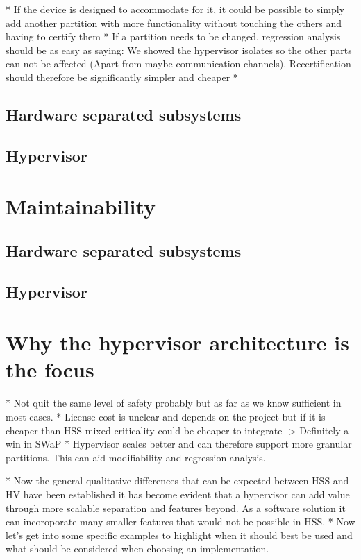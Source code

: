 * If the device is designed to accommodate for
it, it could be possible to simply add another partition with more functionality without touching the others and having to certify them
* If a partition needs to be changed, regression analysis should be as easy as saying: We showed the hypervisor isolates so the other parts can not be affected (Apart from maybe communication channels). Recertification should therefore be significantly simpler and cheaper
* 
\subsection{Hardware separated subsystems}
\subsection{Hypervisor}


\section{Maintainability}
\subsection{Hardware separated subsystems}
\subsection{Hypervisor}


\section{Why the hypervisor architecture is the focus}

* Not quit the same level of safety probably but as far as we know sufficient in most cases. 
* License cost is unclear and depends on the project but if it is cheaper than HSS mixed criticality could be cheaper to integrate
-> Definitely a win in SWaP
* Hypervisor scales better and can therefore support more granular partitions. This can aid modifiability and regression analysis.

* Now the general qualitative differences that can be expected between HSS and HV have been established it has become evident that a hypervisor can add value through more scalable separation and features beyond. As a software solution it can incoroporate many smaller features that would not be possible in HSS.
* Now let's get into some specific examples to highlight when it should best be used and what should be considered when choosing an implementation.

